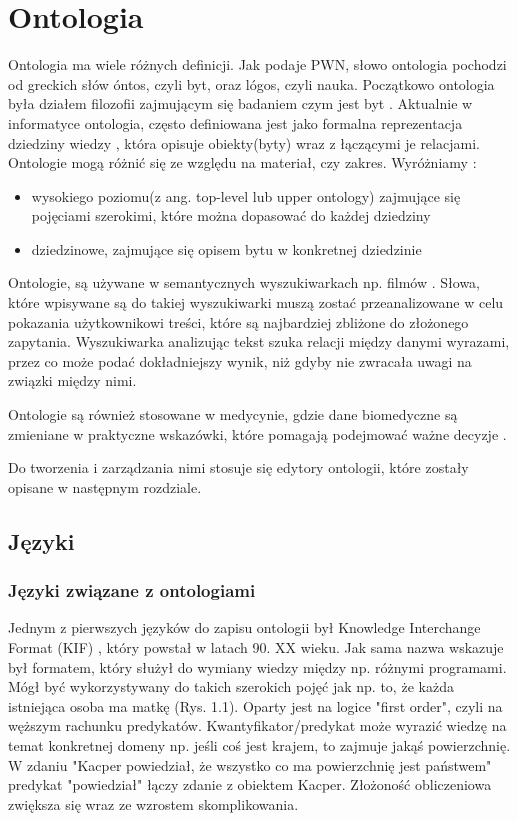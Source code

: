 \documentclass[a4paper,12pt, twoside]{book} %
\begin{document}
\chapter{Ontologia}
Ontologia ma wiele różnych definicji. Jak podaje PWN, słowo ontologia pochodzi od greckich słów óntos, czyli byt, oraz lógos, czyli nauka. Początkowo ontologia była działem filozofii zajmującym się badaniem czym jest byt \cite{PWN}. Aktualnie w informatyce ontologia, często definiowana jest jako formalna reprezentacja dziedziny wiedzy \cite{wikipediaont}, która opisuje obiekty(byty) wraz z łączącymi je relacjami. 
Ontologie mogą różnić się ze względu na materiał, czy zakres.
Wyróżniamy \cite{Strozewski.2004}:
\begin{itemize}
	\item wysokiego poziomu(z ang. top-level lub upper ontology) zajmujące się pojęciami szerokimi, które można dopasować do każdej dziedziny \cite{wikipediaupper}
	\item dziedzinowe, zajmujące się opisem bytu w konkretnej dziedzinie
\end{itemize}

Ontologie, są używane w semantycznych wyszukiwarkach np. filmów \cite{6508326}. Słowa, które wpisywane są do takiej wyszukiwarki muszą zostać przeanalizowane w celu pokazania użytkownikowi treści, które są najbardziej zbliżone do złożonego zapytania. Wyszukiwarka analizując tekst szuka relacji między danymi wyrazami, przez co może podać dokładniejszy wynik, niż gdyby nie zwracała uwagi na związki między nimi. 

Ontologie są również stosowane w medycynie, gdzie dane biomedyczne są zmieniane w praktyczne wskazówki, które pomagają podejmować ważne decyzje \cite{protegeabout}.

Do tworzenia i zarządzania nimi stosuje się edytory ontologii, które zostały opisane w następnym rozdziale.
\section{Języki}
\subsection{Języki związane z ontologiami}
Jednym z pierwszych języków do zapisu ontologii był Knowledge Interchange Format (KIF) \cite{wikipediaont}, który powstał w latach 90. XX wieku. Jak sama nazwa wskazuje był formatem, który służył do wymiany wiedzy między np. różnymi programami. Mógł być wykorzystywany do takich szerokich pojęć jak np. to, że każda istniejąca osoba ma matkę (Rys. 1.1). Oparty jest na logice "first order", czyli na węższym rachunku predykatów. Kwantyfikator/predykat może wyrazić wiedzę na temat konkretnej domeny np. jeśli coś jest krajem, to zajmuje jakąś powierzchnię. W zdaniu "Kacper powiedział, że wszystko co ma powierzchnię jest państwem" predykat "powiedział" łączy zdanie z obiektem Kacper. Złożoność obliczeniowa zwiększa się wraz ze wzrostem skomplikowania.
\end{document}
